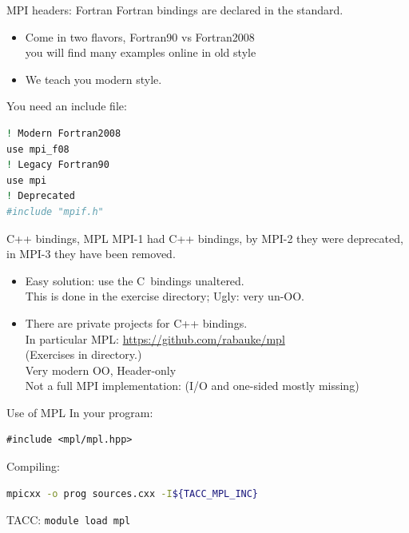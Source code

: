 \begin{fortran}
  \addtocounter{slidecount}{-1}
\begin{numberedframe}{MPI headers: Fortran}
    \label{sl:mpi-header-f}
    Fortran bindings are declared in the standard.
    \begin{itemize}
    \item Come in two flavors, Fortran90 vs Fortran2008\\
      you will find many examples online in old style
    \item We teach you modern style.
    \end{itemize}
    You need an include file:
\begin{lstlisting}[language=bash]
! Modern Fortran2008
use mpi_f08
! Legacy Fortran90
use mpi       
! Deprecated
#include "mpif.h"
\end{lstlisting}
\end{numberedframe}
\end{fortran}

\begin{mpl}
  \addtocounter{slidecount}{-1}
\begin{numberedframe}{C++ bindings, MPL}
  MPI-1 had C++ bindings, by MPI-2 they were deprecated, in MPI-3 they have been removed.
  \begin{itemize}
  \item Easy solution: use the C~bindings unaltered.\\
    This is done in the  exercise directory;  Ugly: very un-OO.
  \item There are private projects for C++ bindings.\\
    In particular
    MPL: \url{https://github.com/rabauke/mpl}\\
    (Exercises in  directory.)\\
    Very modern OO,  Header-only\\
    Not a full MPI implementation: (I/O and one-sided mostly missing)
  \end{itemize}
\end{numberedframe}
\begin{numberedframe}{Use of MPL}
    In your program:
\begin{lstlisting}[numbers=none]
#include <mpl/mpl.hpp>
\end{lstlisting}
    Compiling:
\begin{lstlisting}[language=bash,numbers=none]
mpicxx -o prog sources.cxx -I${TACC_MPL_INC}
\end{lstlisting}
TACC: \texttt{module load mpl}
\end{numberedframe}
\end{mpl}

